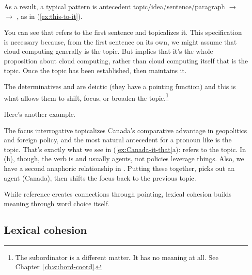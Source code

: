 As a result, a typical pattern is antecedent topic/idea/sentence/paragraph $\rightarrow$  $\rightarrow$ , as in (\ref{ex:this-to-it}).

\label{ex:this-to-it}
\z
You can see that  refers to the first sentence and topicalizes it. This specification is necessary because, from the first sentence on its own, we might assume that cloud computing generally is the topic. But  implies that it's the whole proposition about cloud computing, rather than cloud computing itself that is the topic. Once the topic has been established, then  maintains it.

The determinatives  and  are deictic (they have a pointing function) and this is what allows them to shift, focus, or broaden the topic.\footnote{The subordinator  is a different matter. It has no meaning at all. See Chapter~\ref{ch:subord-coord}.}

Here's another example.

\ea \label{ex:Canada-it-that}
    \z
\z
The focus interrogative topicalizes Canada's comparative advantage in geopolitics and foreign policy, and the most natural antecedent for a pronoun like  is the topic. That's exactly what we see in  (\ref{ex:Canada-it-that}a):  refers to the topic. In (b), though, the verb is  and usually agents, not policies leverage things. Also, we have a second anaphoric relationship in . Putting these together,  picks out an agent (Canada), then  shifts the focus back to the previous topic.

\bigskip

While reference creates connections through pointing, lexical cohesion builds meaning through word choice itself.

\subsection{Lexical cohesion}

